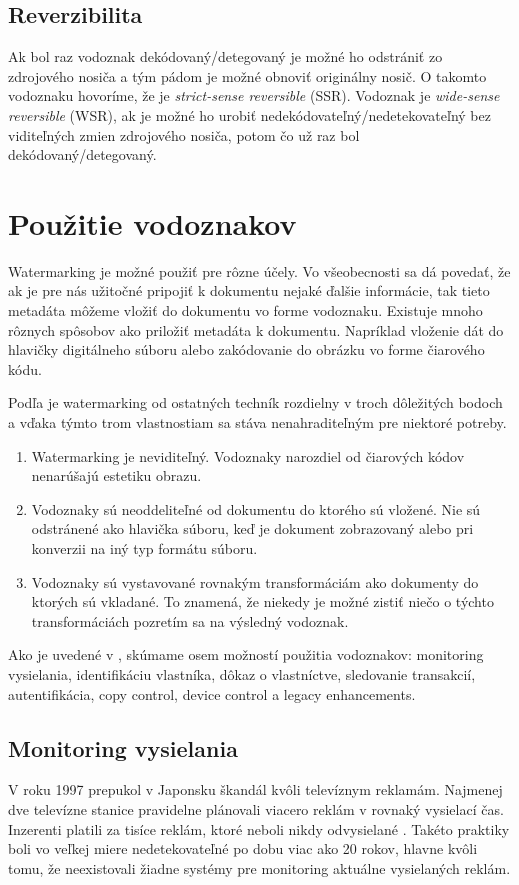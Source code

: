 \subsection{Reverzibilita}
Ak bol raz vodoznak dekódovaný/detegovaný je možné ho odstrániť zo zdrojového nosiča a tým pádom je možné obnoviť originálny nosič. O takomto vodoznaku hovoríme, že je {\it strict-sense reversible} (SSR). Vodoznak je {\it wide-sense reversible} (WSR), ak je možné ho urobiť nedekódovateľný/nedetekovateľný bez viditeľných zmien zdrojového nosiča, potom čo už raz bol dekódovaný/detegovaný. \cite{Barni}

\section{Použitie vodoznakov}
Watermarking je možné použiť pre rôzne účely. Vo všeobecnosti sa dá povedať, že ak je pre nás užitočné pripojiť k dokumentu nejaké ďalšie informácie, tak tieto metadáta môžeme vložiť do dokumentu vo forme vodoznaku. Existuje mnoho rôznych spôsobov ako priložiť metadáta k dokumentu. Napríklad vloženie dát do hlavičky digitálneho súboru alebo zakódovanie do obrázku vo forme čiarového kódu.

Podľa \cite{Cox} je watermarking od ostatných techník rozdielny v troch dôležitých bodoch a vďaka týmto trom vlastnostiam sa stáva nenahraditeľným pre niektoré potreby.
\begin{enumerate}
    \item Watermarking je neviditeľný. Vodoznaky narozdiel od čiarových kódov nenarúšajú estetiku obrazu.
    \item Vodoznaky sú neoddeliteľné od dokumentu do ktorého sú vložené. Nie sú odstránené ako hlavička súboru, keď je dokument zobrazovaný alebo pri konverzii na iný typ formátu súboru.
    \item Vodoznaky sú vystavované rovnakým transformáciám ako dokumenty do ktorých sú vkladané. To znamená, že niekedy je možné zistiť niečo o týchto transformáciách pozretím sa na výsledný vodoznak.
\end{enumerate}

Ako je uvedené v \cite{Cox}, skúmame osem možností použitia vodoznakov: monitoring vysielania, identifikáciu vlastníka, dôkaz o vlastníctve, sledovanie transakcií, autentifikácia, copy control, device control a legacy enhancements.

\subsection{Monitoring vysielania}
V roku 1997 prepukol v Japonsku škandál kvôli televíznym reklamám. Najmenej dve televízne stanice pravidelne plánovali viacero reklám v rovnaký vysielací čas. Inzerenti platili za tisíce reklám, ktoré neboli nikdy odvysielané \cite{Cox}. Takéto praktiky boli vo veľkej miere nedetekovateľné po dobu viac ako 20 rokov, hlavne kvôli tomu, že neexistovali žiadne systémy pre monitoring aktuálne vysielaných reklám.

